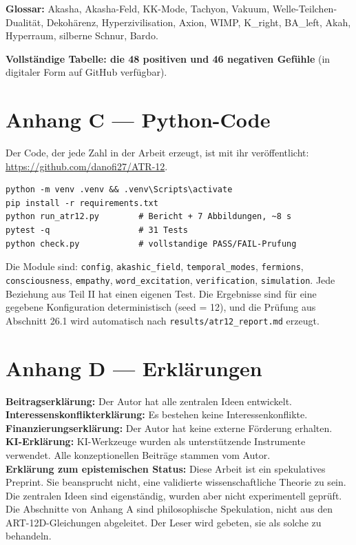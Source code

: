 \textbf{Glossar:} Akasha, Akasha-Feld, KK-Mode, Tachyon, Vakuum, Welle-Teilchen-Dualität, Dekohärenz, Hyperzivilisation, Axion, WIMP, K\_right, BA\_left, Akah, Hyperraum, silberne Schnur, Bardo.

\textbf{Vollständige Tabelle: die 48 positiven und 46 negativen Gefühle} (in digitaler Form auf GitHub verfügbar).

\section{Anhang C --- Python-Code}
Der Code, der jede Zahl in der Arbeit erzeugt, ist mit ihr veröffentlicht: \url{https://github.com/danofi27/ATR-12}.

\begin{verbatim}
python -m venv .venv && .venv\Scripts\activate
pip install -r requirements.txt
python run_atr12.py        # Bericht + 7 Abbildungen, ~8 s
pytest -q                  # 31 Tests
python check.py            # vollstandige PASS/FAIL-Prufung
\end{verbatim}

Die Module sind: \texttt{config}, \texttt{akashic\_field}, \texttt{temporal\_modes}, \texttt{fermions}, \texttt{consciousness}, \texttt{empathy}, \texttt{word\_excitation}, \texttt{verification}, \texttt{simulation}. Jede Beziehung aus Teil II hat einen eigenen Test. Die Ergebnisse sind für eine gegebene Konfiguration deterministisch (seed = 12), und die Prüfung aus Abschnitt 26.1 wird automatisch nach \texttt{results/atr12\_report.md} erzeugt.

\section{Anhang D --- Erklärungen}
\textbf{Beitragserklärung:} Der Autor hat alle zentralen Ideen entwickelt. \\
\textbf{Interessenskonflikterklärung:} Es bestehen keine Interessenkonflikte. \\
\textbf{Finanzierungserklärung:} Der Autor hat keine externe Förderung erhalten. \\
\textbf{KI-Erklärung:} KI-Werkzeuge wurden als unterstützende Instrumente verwendet. Alle konzeptionellen Beiträge stammen vom Autor. \\
\textbf{Erklärung zum epistemischen Status:} Diese Arbeit ist ein spekulatives Preprint. Sie beansprucht nicht, eine validierte wissenschaftliche Theorie zu sein. Die zentralen Ideen sind eigenständig, wurden aber nicht experimentell geprüft. Die Abschnitte von Anhang A sind philosophische Spekulation, nicht aus den ART-12D-Gleichungen abgeleitet. Der Leser wird gebeten, sie als solche zu behandeln.

